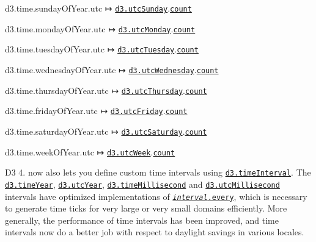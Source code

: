 \begin{DoxyItemize}
\item d3.\+time.\+sunday\+Of\+Year.\+utc ↦ \href{https://github.com/d3/d3-time/blob/master/README.md#utcSunday}{\tt d3.\+utc\+Sunday}.\href{https://github.com/d3/d3-time/blob/master/README.md#interval_count}{\tt count}
\item d3.\+time.\+monday\+Of\+Year.\+utc ↦ \href{https://github.com/d3/d3-time/blob/master/README.md#utcMonday}{\tt d3.\+utc\+Monday}.\href{https://github.com/d3/d3-time/blob/master/README.md#interval_count}{\tt count}
\item d3.\+time.\+tuesday\+Of\+Year.\+utc ↦ \href{https://github.com/d3/d3-time/blob/master/README.md#utcTuesday}{\tt d3.\+utc\+Tuesday}.\href{https://github.com/d3/d3-time/blob/master/README.md#interval_count}{\tt count}
\item d3.\+time.\+wednesday\+Of\+Year.\+utc ↦ \href{https://github.com/d3/d3-time/blob/master/README.md#utcWednesday}{\tt d3.\+utc\+Wednesday}.\href{https://github.com/d3/d3-time/blob/master/README.md#interval_count}{\tt count}
\item d3.\+time.\+thursday\+Of\+Year.\+utc ↦ \href{https://github.com/d3/d3-time/blob/master/README.md#utcThursday}{\tt d3.\+utc\+Thursday}.\href{https://github.com/d3/d3-time/blob/master/README.md#interval_count}{\tt count}
\item d3.\+time.\+friday\+Of\+Year.\+utc ↦ \href{https://github.com/d3/d3-time/blob/master/README.md#utcFriday}{\tt d3.\+utc\+Friday}.\href{https://github.com/d3/d3-time/blob/master/README.md#interval_count}{\tt count}
\item d3.\+time.\+saturday\+Of\+Year.\+utc ↦ \href{https://github.com/d3/d3-time/blob/master/README.md#utcSaturday}{\tt d3.\+utc\+Saturday}.\href{https://github.com/d3/d3-time/blob/master/README.md#interval_count}{\tt count}
\item d3.\+time.\+week\+Of\+Year.\+utc ↦ \href{https://github.com/d3/d3-time/blob/master/README.md#utcWeek}{\tt d3.\+utc\+Week}.\href{https://github.com/d3/d3-time/blob/master/README.md#interval_count}{\tt count}
\end{DoxyItemize}

D3 4. now also lets you define custom time intervals using \href{https://github.com/d3/d3-time/blob/master/README.md#timeInterval}{\tt d3.\+time\+Interval}. The \href{https://github.com/d3/d3-time/blob/master/README.md#timeYear}{\tt d3.\+time\+Year}, \href{https://github.com/d3/d3-time/blob/master/README.md#utcYear}{\tt d3.\+utc\+Year}, \href{https://github.com/d3/d3-time/blob/master/README.md#timeMillisecond}{\tt d3.\+time\+Millisecond} and \href{https://github.com/d3/d3-time/blob/master/README.md#utcMillisecond}{\tt d3.\+utc\+Millisecond} intervals have optimized implementations of \href{https://github.com/d3/d3-time/blob/master/README.md#interval_every}{\tt {\itshape interval}.every}, which is necessary to generate time ticks for very large or very small domains efficiently. More generally, the performance of time intervals has been improved, and time intervals now do a better job with respect to daylight savings in various locales.

